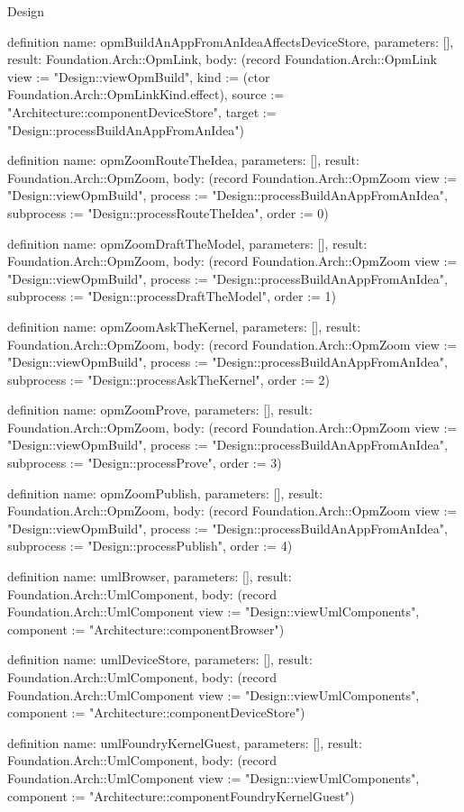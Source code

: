 \begin{lexlean}{Design}
\begin{semanticmodule}
definition{
  name: opmBuildAnAppFromAnIdeaAffectsDeviceStore,
  parameters: [],
  result: Foundation.Arch::OpmLink,
  body: (record Foundation.Arch::OpmLink {view := "Design::viewOpmBuild", kind := (ctor Foundation.Arch::OpmLinkKind.effect), source := "Architecture::componentDeviceStore", target := "Design::processBuildAnAppFromAnIdea"})
}

definition{
  name: opmZoomRouteTheIdea,
  parameters: [],
  result: Foundation.Arch::OpmZoom,
  body: (record Foundation.Arch::OpmZoom {view := "Design::viewOpmBuild", process := "Design::processBuildAnAppFromAnIdea", subprocess := "Design::processRouteTheIdea", order := 0})
}

definition{
  name: opmZoomDraftTheModel,
  parameters: [],
  result: Foundation.Arch::OpmZoom,
  body: (record Foundation.Arch::OpmZoom {view := "Design::viewOpmBuild", process := "Design::processBuildAnAppFromAnIdea", subprocess := "Design::processDraftTheModel", order := 1})
}

definition{
  name: opmZoomAskTheKernel,
  parameters: [],
  result: Foundation.Arch::OpmZoom,
  body: (record Foundation.Arch::OpmZoom {view := "Design::viewOpmBuild", process := "Design::processBuildAnAppFromAnIdea", subprocess := "Design::processAskTheKernel", order := 2})
}

definition{
  name: opmZoomProve,
  parameters: [],
  result: Foundation.Arch::OpmZoom,
  body: (record Foundation.Arch::OpmZoom {view := "Design::viewOpmBuild", process := "Design::processBuildAnAppFromAnIdea", subprocess := "Design::processProve", order := 3})
}

definition{
  name: opmZoomPublish,
  parameters: [],
  result: Foundation.Arch::OpmZoom,
  body: (record Foundation.Arch::OpmZoom {view := "Design::viewOpmBuild", process := "Design::processBuildAnAppFromAnIdea", subprocess := "Design::processPublish", order := 4})
}

definition{
  name: umlBrowser,
  parameters: [],
  result: Foundation.Arch::UmlComponent,
  body: (record Foundation.Arch::UmlComponent {view := "Design::viewUmlComponents", component := "Architecture::componentBrowser"})
}

definition{
  name: umlDeviceStore,
  parameters: [],
  result: Foundation.Arch::UmlComponent,
  body: (record Foundation.Arch::UmlComponent {view := "Design::viewUmlComponents", component := "Architecture::componentDeviceStore"})
}

definition{
  name: umlFoundryKernelGuest,
  parameters: [],
  result: Foundation.Arch::UmlComponent,
  body: (record Foundation.Arch::UmlComponent {view := "Design::viewUmlComponents", component := "Architecture::componentFoundryKernelGuest"})
}


\end{semanticmodule}
\end{lexlean}
